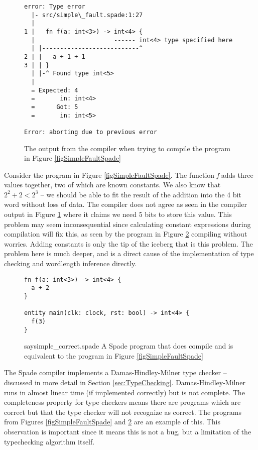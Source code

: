 \begin{figure}[h!]
\centering
  \begin{verbatim}
error: Type error
  |- src/simple\_fault.spade:1:27
  |
1 |   fn f(a: int<3>) -> int<4> {
  |                      ------ int<4> type specified here
  | |---------------------------^
2 | |   a + 1 + 1
3 | | }
  | |-^ Found type int<5>
  |
  = Expected: 4
  =       in: int<4>
  =      Got: 5
  =       in: int<5>

Error: aborting due to previous error
\end{verbatim}
\caption{The output from the compiler when trying to compile the program in Figure \ref{figSimpleFaultSpade}}
\label{figSimpleFaultSpadeCompileOutput}
\end{figure}

Consider the program in Figure \ref{figSimpleFaultSpade}. The function \textit{f} adds three values together, two of which are known constants. We also know that $2^2 + 2 < 2^3$ -- we should be able to fit the result of the addition into the 4 bit word without loss of data. The compiler does not agree as seen in the compiler output in Figure \ref{figSimpleFaultSpadeCompileOutput} where it claims we need 5 bits to store this value. This problem may seem inconsequential since calculating constant expressions during compilation will fix this, as seen by the program in Figure \ref{figSimpleCorrectSpade} compiling without worries. Adding constants is only the tip of the iceberg that is this problem. The problem here is much deeper, and is a direct cause of the implementation of type checking and wordlength inference directly.

\begin{figure}[h!]
\centering
  \begin{verbatim}
fn f(a: int<3>) -> int<4> {
  a + 2
}

entity main(clk: clock, rst: bool) -> int<4> {
  f(3)
}
\end{verbatim}
  \caption{say{simple\_correct.spade} A Spade program that does compile and is equivalent to the program in Figure \ref{figSimpleFaultSpade}}
\label{figSimpleCorrectSpade}
\end{figure}

The Spade compiler implements a Damas-Hindley-Milner type checker -- discussed in more detail in Section \ref{sec:TypeChecking}. Damas-Hindley-Milner runs in almost linear time (if implemented correctly) but is not complete. The completeness property for type checkers means there are programs which are correct but that the type checker will not recognize as correct. The programs from Figures \ref{figSimpleFaultSpade} and \ref{figSimpleCorrectSpade} are an example of this. This observation is important since it means this is not a bug, but a limitation of the typechecking algorithm itself.

